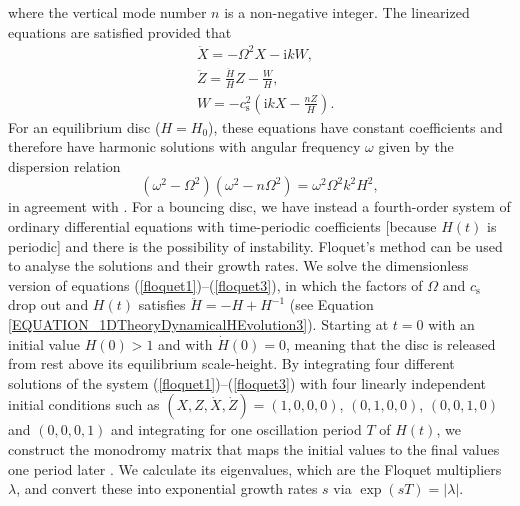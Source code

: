 \documentclass[fleqn,usenatbib]{mnras}
\newcommand{\ii}{\mathrm{i}}
\begin{document}
where the vertical mode number $n$ is a non-negative integer. The linearized equations are satisfied provided that
\begin{align}
  &\ddot X=-\Omega^2X-\ii kW,\label{floquet1}\\
  &\ddot Z=\frac{\ddot H}{H}Z-\frac{W}{H},\label{floquet2}\\
  &W=-c_\text{s}^2\left(\ii kX-\frac{nZ}{H}\right).\label{floquet3}
\end{align}
For an equilibrium disc ($H=H_0$), these equations have constant coefficients and therefore have harmonic solutions with angular frequency $\omega$ given by the dispersion relation
\begin{equation}
  (\omega^2-\Omega^2)(\omega^2-n\Omega^2)=\omega^2\Omega^2k^2H^2,
\end{equation}
in agreement with \citet{okazaki1987gloval}. For a bouncing disc, we have instead a fourth-order system of ordinary differential equations with time-periodic coefficients [because $H(t)$ is periodic] and there is the possibility of instability. Floquet's method can be used to analyse the solutions and their growth rates. 
We solve the dimensionless version of equations (\ref{floquet1})--(\ref{floquet3}), in which the factors of $\Omega$ and $c_\text{s}$ drop out and $H(t)$ satisfies $\ddot H=-H+H^{-1}$ (see Equation \ref{EQUATION_1DTheoryDynamicalHEvolution3}).
Starting at $t=0$ with an initial value $H(0)>1$ and with $\dot H(0)=0$, meaning that the disc is released from rest above its equilibrium scale-height. By integrating four different solutions of the system (\ref{floquet1})--(\ref{floquet3}) with four linearly independent initial conditions such as $(X,Z,\dot X,\dot Z)=(1,0,0,0)$, $(0,1,0,0)$, $(0,0,1,0)$ and $(0,0,0,1)$ and integrating for one oscillation period $T$ of $H(t)$, we construct the monodromy matrix that maps the initial values to the final values one period later \citep{teschl2024ordinary}. We calculate its eigenvalues, which are the Floquet multipliers $\lambda$, and convert these into exponential growth rates $s$ via $\exp(sT)=|\lambda|$. 
\end{document}
